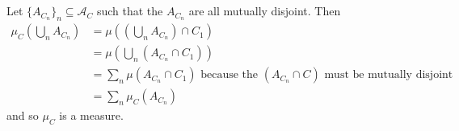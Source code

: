 \documentclass{unswmaths}
\begin{document}
\subsection{}
Let $ \{ A_{C_n} \}_n \subseteq \mathcal{A}_C $ such that the $ A_{C_n} $ are all mutually disjoint. Then
\begin{align*}
    \mu_C\left( \bigcup_n A_{C_n} \right) &= \mu\left( \left( \bigcup_n A_{C_n} \right) \cap C_1 \right) \\
        &=  \mu\left( \bigcup_n (A_{C_n} \cap C_1) \right) \\
        &= \sum_n \mu(A_{C_n} \cap C_1) \text{ because the } (A_{C_n} \cap C) \text{ must be mutually disjoint }\\
        &= \sum_n \mu_C ( A_{C_n})
\end{align*}
and so $ \mu_C $ is a measure. 
\end{document}
